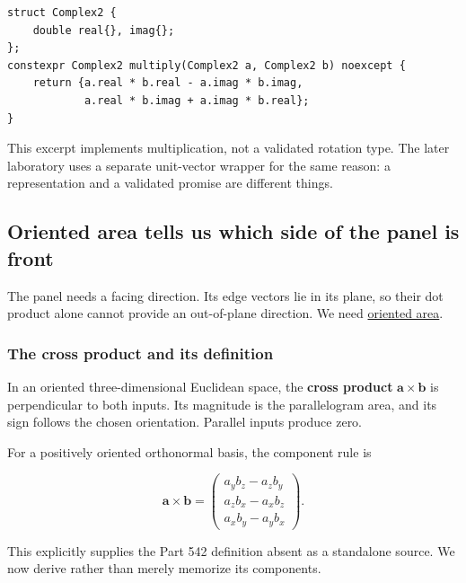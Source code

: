 \begin{verbatim}
struct Complex2 {
    double real{}, imag{};
};
constexpr Complex2 multiply(Complex2 a, Complex2 b) noexcept {
    return {a.real * b.real - a.imag * b.imag,
            a.real * b.imag + a.imag * b.real};
}
\end{verbatim}

This excerpt implements multiplication, not a validated rotation type. The later laboratory uses a separate unit-vector wrapper for the same reason: a representation and a validated promise are different things.

\subsection{Oriented area tells us which side of the panel is front}\label{01-foundations-i-ch017-oriented-area-tells-us-which-side-of-the-panel-is-front}

\hypertarget{01-foundations-i-ch017-oriented-area-tells-us-which-side-of-the-panel-is-front}{}

The panel needs a facing direction. Its edge vectors lie in its plane, so their dot product alone cannot provide an out-of-plane direction. We need \hyperref[01-foundations-i-ch017-oriented-area-tells-us-which-side-of-the-panel-is-front]{oriented area}.

\subsubsection{The cross product and its definition}\label{01-foundations-i-ch017-the-cross-product-and-its-definition}

\hypertarget{01-foundations-i-ch017-the-cross-product-and-its-definition}{}

In an oriented three-dimensional Euclidean space, the \textbf{cross product} \(\mathbf a\times\mathbf b\) is perpendicular to both inputs. Its magnitude is the parallelogram area, and its sign follows the chosen orientation. Parallel inputs produce zero.

For a positively oriented orthonormal basis, the component rule is

\[
\mathbf a\times\mathbf b=
\begin{pmatrix}
a_yb_z-a_zb_y\\
a_zb_x-a_xb_z\\
a_xb_y-a_yb_x
\end{pmatrix}.
\]

This explicitly supplies the Part 542 definition absent as a standalone source. We now derive rather than merely memorize its components.

